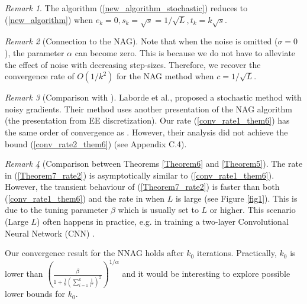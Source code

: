 \documentclass{article}
\theoremstyle{plain}
\theoremstyle{definition}
\theoremstyle{remark}
\newtheorem{remark}{Remark}[theorem]
\begin{document}
\begin{remark}
    The algorithm (\ref{new_algorithm_stochastic}) reduces to (\ref{new_algorithm}) when \(e_k=0, s_k=\sqrt{s}=1/\sqrt{L}, t_k=k\sqrt{s}\).
\end{remark}
\begin{remark}[Connection to the NAG]
    Note that when the noise is omitted ($\sigma=0$), the parameter $\alpha$ can become zero. This is because we do not have to alleviate the effect of noise with decreasing step-sizes. Therefore, we recover the convergence rate of $O(1/k^2)$ for the NAG method when $c=1/\sqrt{L}$.
\end{remark}
\begin{remark}[Comparison with \citep{pmlr-v108-laborde20a}]
    Laborde et al., proposed a stochastic method with noisy gradients. Their method uses another presentation of the NAG algorithm (the presentation from EE discretization). Our rate (\ref{conv_rate1_them6}) has the same order of convergence as \citep{pmlr-v108-laborde20a}. However, their analysis did not achieve the bound (\ref{conv_rate2_them6}) (see \citep{pmlr-v108-laborde20a} Appendix C.4).
\end{remark}






\begin{remark}[Comparison between Theorems \ref{Theorem6} and \ref{Theorem5}]
    The rate in (\ref{Theorem7_rate2}) is asymptotically similar to (\ref{conv_rate1_them6}). However, the transient behaviour of (\ref{Theorem7_rate2}) is faster than both (\ref{conv_rate1_them6}) and the rate in \citep{pmlr-v108-laborde20a} when \(L\) is large (see Figure \ref{fig1}). This is due to the tuning parameter \(\beta\) which is usually set to \(L\) or higher. This scenario (Large \(L\)) often happens in practice, e.g. in training a two-layer Convolutional Neural Network (CNN) \citep{shi2022efficiently}. \par
    Our convergence result for the NNAG holds after \(k_0\) iterations. Practically, \(k_0\) is lower than \(\left(\frac{\beta}{1+\tfrac{1}{8}(\sum_{i=1}^{k}\tfrac{1}{i^{\alpha}})^2}\right)^{1/\alpha}\) and it would be interesting to explore possible lower bounds for \(k_0\).
\end{remark}
\end{document}
